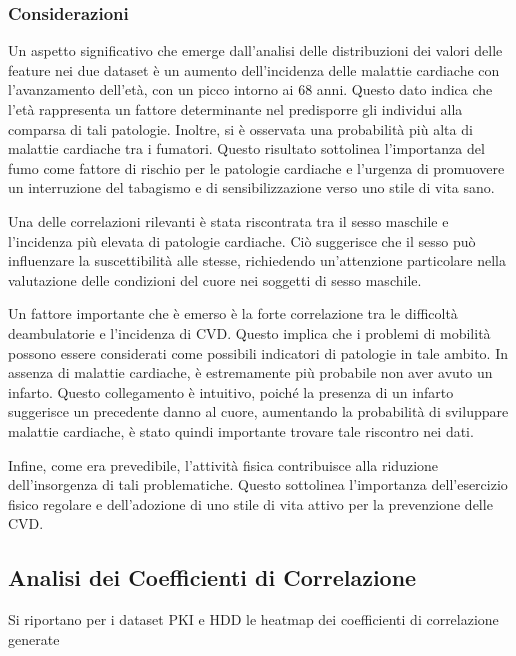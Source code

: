 \subsubsection{Considerazioni}
\begin{flushleft}
    
Un aspetto significativo che emerge dall'analisi delle distribuzioni dei valori delle feature nei due dataset è un aumento dell'incidenza delle malattie cardiache con l'avanzamento dell'età, con un picco intorno ai 68 anni. Questo dato indica che l'età rappresenta un fattore determinante nel predisporre gli individui alla comparsa di tali patologie. 
Inoltre, si è osservata una probabilità più alta di malattie cardiache tra i fumatori. Questo risultato sottolinea l'importanza del fumo come fattore di rischio per le patologie cardiache e l'urgenza di promuovere un interruzione del tabagismo e di sensibilizzazione verso uno stile di vita sano.

Una delle correlazioni rilevanti è stata riscontrata tra il sesso maschile e l'incidenza più elevata di patologie cardiache. Ciò suggerisce che il sesso può influenzare la suscettibilità alle stesse, richiedendo un'attenzione particolare nella valutazione delle condizioni del cuore nei soggetti di sesso maschile.

Un fattore importante che è emerso è la forte correlazione tra le difficoltà deambulatorie e l'incidenza di CVD. Questo implica che i problemi di mobilità possono essere considerati come possibili indicatori di patologie in tale ambito.
In assenza di malattie cardiache, è estremamente più probabile non aver avuto un infarto. Questo collegamento è intuitivo, poiché la presenza di un infarto suggerisce un precedente danno al cuore, aumentando la probabilità di sviluppare malattie cardiache, è stato quindi importante trovare tale riscontro nei dati.

Infine, come era prevedibile, l'attività fisica contribuisce alla riduzione dell'insorgenza di tali problematiche. Questo sottolinea l'importanza dell'esercizio fisico regolare e dell'adozione di uno stile di vita attivo per la prevenzione delle CVD.
\end{flushleft}


\subsection{Analisi dei Coefficienti di Correlazione}

Si riportano per i dataset PKI e HDD
le heatmap dei coefficienti di correlazione generate




